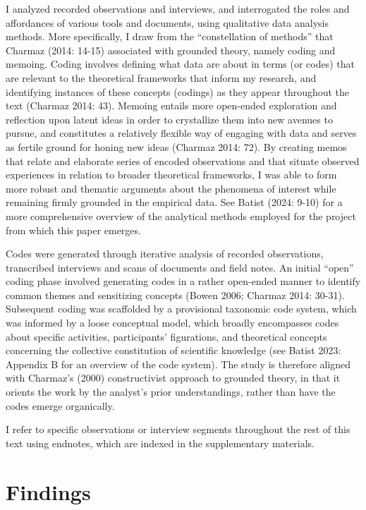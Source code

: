 \documentclass[
]{article}
\begin{document}
I analyzed recorded observations and interviews, and interrogated the
roles and affordances of various tools and documents, using qualitative
data analysis methods. More specifically, I draw from the
``constellation of methods'' that Charmaz (2014: 14-15) associated with
grounded theory, namely coding and memoing. Coding involves defining
what data are about in terms (or codes) that are relevant to the
theoretical frameworks that inform my research, and identifying
instances of these concepts (codings) as they appear throughout the text
(Charmaz 2014: 43). Memoing entails more open-ended exploration and
reflection upon latent ideas in order to crystallize them into new
avenues to pursue, and constitutes a relatively flexible way of engaging
with data and serves as fertile ground for honing new ideas (Charmaz
2014: 72). By creating memos that relate and elaborate series of encoded
observations and that situate observed experiences in relation to
broader theoretical frameworks, I was able to form more robust and
thematic arguments about the phenomena of interest while remaining
firmly grounded in the empirical data. See Batist (2024: 9-10) for a
more comprehensive overview of the analytical methods employed for the
project from which this paper emerges.

Codes were generated through iterative analysis of recorded
observations, transcribed interviews and scans of documents and field
notes. An initial ``open'' coding phase involved generating codes in a
rather open-ended manner to identify common themes and sensitizing
concepts (Bowen 2006; Charmaz 2014: 30-31). Subsequent coding was
scaffolded by a provisional taxonomic code system, which was informed by
a loose conceptual model, which broadly encompasses codes about specific
activities, participants' figurations, and theoretical concepts
concerning the collective constitution of scientific knowledge (see
Batist 2023: Appendix B for an overview of the code system). The study
is therefore aligned with Charmaz's (2000) constructivist approach to
grounded theory, in that it orients the work by the analyst's prior
understandings, rather than have the codes emerge organically.

I refer to specific observations or interview segments throughout the
rest of this text using endnotes, which are indexed in the supplementary
materials.

\section{Findings}\label{findings}
\end{document}
